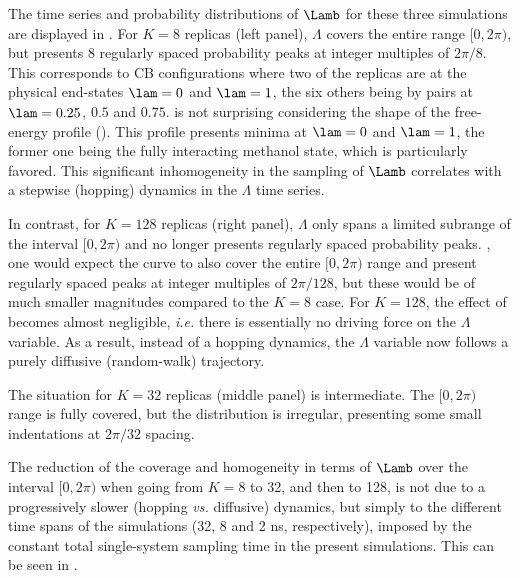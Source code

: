 The time series and probability distributions of 
 $\Lamb$ for these three simulations
are displayed in .
%
For $K=8$ replicas (left panel), $\Lambda$ covers the entire range
$[0,2\pi)$, but presents 8 regularly spaced probability peaks
at integer multiples of $2\pi/8$. This corresponds
to CB configurations where 
two of the replicas are at the physical end-states $\lam=0$ and $\lam=1$,
the six others being by pairs at $\lam=0.25$, $0.5$ and $0.75$.
%
 is not surprising considering the shape of the free-energy profile
(). This profile presents minima at $\lam=0$ and $\lam=1$, the former one being
the fully interacting methanol state, which is particularly favored.
%
This significant inhomogeneity in the sampling of $\Lamb$ correlates with a 
stepwise (hopping) dynamics in the $\Lambda$ time series.

In contrast, for $K=128$ replicas (right panel), $\Lambda$ only spans a limited 
subrange of the interval $[0,2\pi)$ and no longer presents regularly 
spaced probability peaks.
%
,
one would
expect the  curve to also cover the entire $[0,2\pi)$ range 
and present regularly spaced peaks 
at integer multiples of $2\pi/128$,
but these would be of much smaller magnitudes compared to the $K=8$ case.
%
For $K=128$, the effect of 
becomes almost negligible, {\em i.e.} there is essentially 
no driving force on the $\Lambda$ variable. As a result, instead of a 
hopping dynamics, the $\Lambda$ variable now follows
a purely diffusive (random-walk) trajectory.
%


The situation for $K=32$ replicas (middle panel) is intermediate.
The $[0,2\pi)$ range is fully covered, but the distribution is 
irregular, presenting some small indentations at $2\pi / 32$ spacing.
%

The reduction of the coverage and homogeneity in terms of $\Lamb$
over the interval $[0,2\pi)$ when going from $K=8$ to 32, and then to 128,
is not due to a progressively slower (hopping {\em vs.} diffusive)
dynamics, but simply to the different time spans of the simulations
(32, 8 and 2 ns, respectively), imposed by the constant total single-system sampling 
time  in the present simulations. 
%
This can be seen in .


